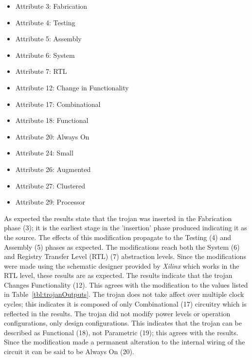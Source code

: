 \documentclass[journal, hidelinks]{IEEEtran}
\begin{document}
\begin{itemize}
	\item Attribute 3: Fabrication
	\item Attribute 4: Testing
	\item Attribute 5: Assembly
	\item Attribute 6: System
	\item Attribute 7: RTL
	\item Attribute 12: Change in Functionality
	\item Attribute 17: Combinational
	\item Attribute 18: Functional
	\item Attribute 20: Always On
	\item Attribute 24: Small
	\item Attribute 26: Augmented
	\item Attribute 27: Clustered
	\item Attribute 29: Processor
\end{itemize}

As expected the results state that the trojan was inserted in the Fabrication phase (3); it is the earliest stage in the 'insertion' phase produced indicating it as the source.
The effects of this modification propagate to the Testing (4) and Assembly (5) phases as expected.
The modifications reach both the System (6) and Registry Transfer Level (RTL) (7) abstraction levels.
Since the modifications were made using the schematic designer provided by \textit{Xilinx} which works in the RTL level, these results are as expected.
The results indicate that the trojan Changes Functionality (12). 
This agrees with the modification to the values listed in Table~\ref{tbl:trojanOutputs}.
The trojan does not take affect over multiple clock cycles; this indicates it is composed of only Combinational (17) circuitry which is reflected in the results.
The trojan did not modify power levels or operation configurations, only design configurations.
This indicates that the trojan can be described as Functional (18), not Parametric (19); this agrees with the results.
Since the modification made a permanent alteration to the internal wiring of the circuit it can be said to be Always On (20).
\end{document}
